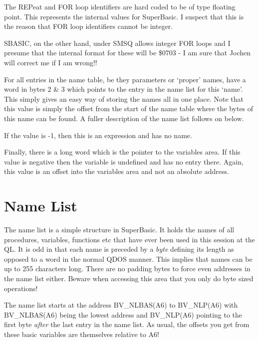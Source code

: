 \begin{note}
The REPeat and FOR loop identifiers are hard coded to be of type
      floating point. This represents the internal values for SuperBasic. I
      suspect that this is the reason that FOR loop identifiers cannot be
      integer. 

SBASIC, on the other hand, under SMSQ allows integer FOR loops and I presume
      that the internal format for these will be \$0703 -{} I am sure that Jochen
      will correct me if I am wrong!!
\end{note}

For all entries in the name table, be they parameters or `proper'
    names, have a word in bytes 2 \& 3 which points to the entry in the
    name list for this `name'. This simply gives an easy way of storing the
    names all in one place. Note that this value is simply the offset from the
    start of the name table where the bytes of this name can be found. A
    fuller description of the name list follows on below.

If the value is -{}1, then this is an expression and has no
    name.

Finally, there is a long word which is the pointer to the variables
    area. If this value is negative then the variable is undefined and has no
    entry there. Again, this value is an offset into the variables area and
    not an absolute address.

\section{Name List}
\label{ch7-name-list}%

The name list is a simple structure in SuperBasic. It holds the
    names of all procedures, variables, functions etc that have ever been used
    in this session at the QL. It is odd in that each name is preceded by a
    \emph{byte} defining its length as opposed to a word in the normal QDOS manner.
    This implies that names can be up to 255 characters long. There are no
    padding bytes to force even addresses in the name list either. Beware when
    accessing this area that you only do byte sized operations!

The name list starts at the address BV\_NLBAS(A6) to BV\_NLP(A6) with
    BV\_NLBAS(A6) being the lowest address and BV\_NLP(A6) pointing to the first
    byte \emph{after} the last entry in the name list. As usual, the offsets you get
    from these basic variables are themselves relative to A6!

